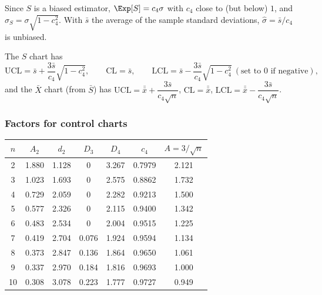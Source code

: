 Since $S$ is a biased estimator, $\Exp[S]=c_4\sigma$ with $c_4$ close to (but below) $1$, and $\sigma_S=\sigma\sqrt{1-c_4^2}$. With $\bar{s}$ the average of the sample standard deviations, $\hat\sigma=\bar{s}/c_4$ is unbiased.

\begin{theorem}\label{thm:xbarS}
The $S$ chart has
\[ \mathrm{UCL}=\bar{s}+\frac{3\bar{s}}{c_4}\sqrt{1-c_4^2},\qquad\mathrm{CL}=\bar{s},\qquad\mathrm{LCL}=\bar{s}-\frac{3\bar{s}}{c_4}\sqrt{1-c_4^2}\ (\text{set to }0\text{ if negative}), \]
and the $\bar{X}$ chart (from $\bar{S}$) has $\mathrm{UCL}=\bar{\bar{x}}+\dfrac{3\bar{s}}{c_4\sqrt n}$, $\mathrm{CL}=\bar{\bar{x}}$, $\mathrm{LCL}=\bar{\bar{x}}-\dfrac{3\bar{s}}{c_4\sqrt n}$.
\end{theorem}

\subsubsection*{Factors for control charts}

\begin{center}
\small
\begin{tabular}{c|ccccc|c}
\toprule
$n$ & $A_2$ & $d_2$ & $D_3$ & $D_4$ & $c_4$ & $A=3/\sqrt n$\\
\midrule
2 & 1.880 & 1.128 & 0 & 3.267 & 0.7979 & 2.121\\
3 & 1.023 & 1.693 & 0 & 2.575 & 0.8862 & 1.732\\
4 & 0.729 & 2.059 & 0 & 2.282 & 0.9213 & 1.500\\
5 & 0.577 & 2.326 & 0 & 2.115 & 0.9400 & 1.342\\
6 & 0.483 & 2.534 & 0 & 2.004 & 0.9515 & 1.225\\
7 & 0.419 & 2.704 & 0.076 & 1.924 & 0.9594 & 1.134\\
8 & 0.373 & 2.847 & 0.136 & 1.864 & 0.9650 & 1.061\\
9 & 0.337 & 2.970 & 0.184 & 1.816 & 0.9693 & 1.000\\
10 & 0.308 & 3.078 & 0.223 & 1.777 & 0.9727 & 0.949\\
\bottomrule
\end{tabular}
\end{center}

